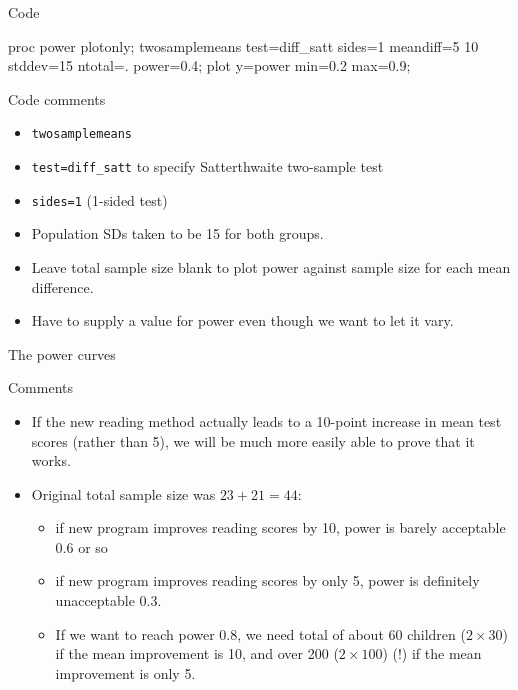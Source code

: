 \documentclass[unknownkeysallowed]{beamer}\usepackage[]{graphicx}\usepackage[]{color}
\begin{document}
\begin{frame}[fragile]{Code}

    \begin{Sascode}[store=pf]
  proc power plotonly;
    twosamplemeans
      test=diff_satt
      sides=1
      meandiff=5 10
      stddev=15
      ntotal=.
      power=0.4;
    plot y=power min=0.2 max=0.9;    
  \end{Sascode}

\end{frame}

\begin{frame}[fragile]{Code comments}
  
  \begin{itemize}
  \item \texttt{twosamplemeans}
  \item \texttt{test=diff\_satt} to specify Satterthwaite two-sample
    test
  \item \texttt{sides=1} (1-sided test)
  \item Population SDs taken to be 15 for both groups.
  \item Leave total sample size blank to plot power against sample
    size for each mean difference.
  \item Have to supply a value for power even though we want to let
    it vary.
  \end{itemize}
  
\end{frame}

\begin{frame}[fragile]{The power curves}
  
  
\end{frame}

\begin{frame}[fragile]{Comments}
  
  \begin{itemize}
  \item If the new reading method actually leads to a 10-point 
   increase in mean test scores (rather than 5), we will be much more
   easily able to prove that it works.
 \item Original total sample size was $23+21=44$:
   \begin{itemize}
   \item if new program improves reading scores by 10, power is barely
     acceptable 0.6 or so
   \item if new program improves reading scores by only 5, power is
     definitely unacceptable 0.3.
   \item If we want to reach power 0.8, we need total of about 60
     children ($2 \times 30$) if the mean improvement is 10, and over
     200 ($2 \times 100$) (!) if the mean improvement is only 5.
   \end{itemize}
  \end{itemize}
  
\end{frame}
\end{document}
